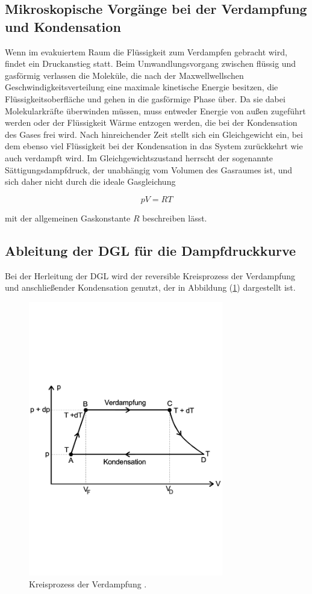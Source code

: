\subsection{Mikroskopische Vorgänge bei der Verdampfung und Kondensation}
Wenn im evakuiertem Raum die Flüssigkeit zum Verdampfen gebracht wird, findet ein Druckanstieg statt.
Beim Umwandlungsvorgang zwischen flüssig und gasförmig verlassen die Moleküle,
die nach der Maxwellwellschen Geschwindigkeitsverteilung eine maximale kinetische Energie
besitzen, die Flüssigkeitsoberfläche und gehen in die gasförmige Phase über.
Da sie dabei Molekularkräfte überwinden müssen, 
muss entweder Energie von außen zugeführt werden oder der Flüssigkeit Wärme entzogen werden,
die bei der Kondensation des Gases frei wird.
Nach hinreichender Zeit stellt sich ein Gleichgewicht ein,
bei dem ebenso viel Flüssigkeit bei der Kondensation
in das System zurückkehrt wie auch verdampft wird. 
Im Gleichgewichtszustand herrscht der sogenannte Sättigungsdampfdruck, 
der unabhängig vom Volumen des Gasraumes ist,
und sich daher nicht durch die ideale Gasgleichung

\begin{equation}
pV = RT
\label{eqn:gasgl}
\end{equation}

\noindent
mit der allgemeinen Gaskonstante $R$ beschreiben lässt.

\subsection{Ableitung der DGL für die Dampfdruckkurve}
Bei der Herleitung der DGL wird der reversible Kreisprozess der Verdampfung
und anschließender Kondensation genutzt, der in Abbildung (\ref{fig:kreis}) dargestellt ist.

\begin{figure}
    \centering
    \includegraphics[width=8.5cm]{kreis.pdf}
    \caption{Kreisprozess der Verdampfung \cite{V203}.}
    \label{fig:kreis}
  \end{figure}

